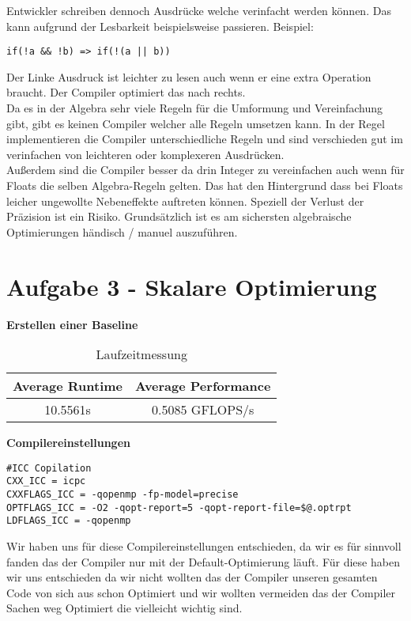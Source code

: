 \documentclass{article}
\begin{document}
Entwickler schreiben dennoch Ausdrücke welche verinfacht werden können. Das kann aufgrund der Lesbarkeit beispielsweise passieren. Beispiel: \begin{verbatim}
if(!a && !b) => if(!(a || b)) 
\end{verbatim} 
Der Linke Ausdruck ist leichter zu lesen auch wenn er eine extra Operation braucht. 
Der Compiler optimiert das nach rechts. \\
Da es in der Algebra sehr viele Regeln für die Umformung und Vereinfachung gibt, gibt es keinen Compiler welcher alle Regeln umsetzen kann. In der Regel implementieren die Compiler unterschiedliche Regeln und sind verschieden gut im verinfachen von leichteren oder komplexeren Ausdrücken. \\
Außerdem sind die Compiler besser da drin Integer zu vereinfachen auch wenn für Floats die selben Algebra-Regeln gelten. Das hat den Hintergrund dass bei Floats leicher ungewollte Nebeneffekte auftreten können. Speziell der Verlust der Präzision ist ein Risiko.
Grundsätzlich ist es am sichersten algebraische Optimierungen händisch / manuel auszuführen.

\newpage

\section{Aufgabe 3 - Skalare Optimierung}
\textbf{Erstellen einer Baseline}

\begin{table}[h]
\centering
\caption{Laufzeitmessung}
\label{tab:label}   
\begin{tabular}{|c|c|}
\hline
\textbf{Average Runtime} & \textbf{Average Performance} \\
\hline
10.5561s & 0.5085 GFLOPS/s \\ 
\hline
\end{tabular}
\end{table}

\textbf{Compilereinstellungen}
\begin{verbatim}
#ICC Copilation
CXX_ICC = icpc
CXXFLAGS_ICC = -qopenmp -fp-model=precise
OPTFLAGS_ICC = -O2 -qopt-report=5 -qopt-report-file=$@.optrpt
LDFLAGS_ICC = -qopenmp
\end{verbatim}

Wir haben uns für diese Compilereinstellungen entschieden, da wir es für sinnvoll fanden das
der Compiler nur mit der Default-Optimierung läuft. Für diese haben wir uns entschieden da
wir nicht wollten das der Compiler unseren gesamten Code von sich aus schon Optimiert und
wir wollten vermeiden das der Compiler Sachen weg Optimiert die vielleicht wichtig sind.
\end{document}
